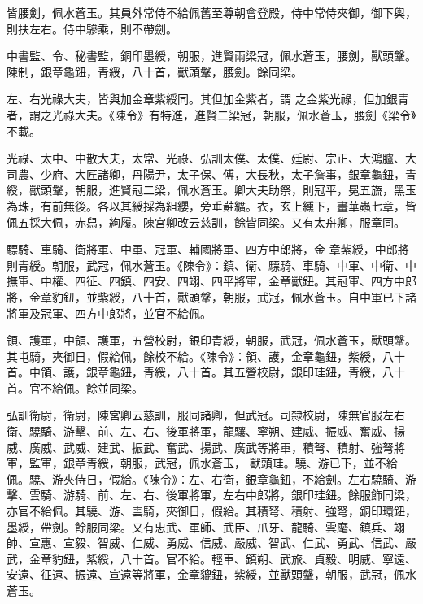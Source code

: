 \begin{pinyinscope}
 皆腰劍，佩水蒼玉。其員外常侍不給佩舊至尊朝會登殿，侍中常侍夾御，御下輿，則扶左右。侍中驂乘，則不帶劍。



 中書監、令、秘書監，銅印墨綬，朝服，進賢兩梁冠，佩水蒼玉，腰劍，獸頭鞶。陳制，銀章龜鈕，青綬，八十首，獸頭鞶，腰劍。餘同梁。



 左、右光祿大夫，皆與加金章紫綬同。其但加金紫者，謂
 之金紫光祿，但加銀青者，謂之光祿大夫。《陳令》有特進，進賢二梁冠，朝服，佩水蒼玉，腰劍《梁令》不載。



 光祿、太中、中散大夫，太常、光祿、弘訓太僕、太僕、廷尉、宗正、大鴻臚、大司農、少府、大匠諸卿，丹陽尹，太子保、傅，大長秋，太子詹事，銀章龜鈕，青綬，獸頭鞶，朝服，進賢冠二梁，佩水蒼玉。卿大夫助祭，則冠平，冕五旒，黑玉為珠，有前無後。各以其綬採為組纓，旁垂黈纊。衣，玄上纁下，畫華蟲七章，皆佩五採大佩，赤舄，絇履。陳宮卿改云慈訓，餘皆同梁。又有太舟卿，服章同。



 驃騎、車騎、衛將軍、中軍、冠軍、輔國將軍、四方中郎將，金
 章紫綬，中郎將則青綬。朝服，武冠，佩水蒼玉。《陳令》：鎮、衛、驃騎、車騎、中軍、中衛、中撫軍、中權、四征、四鎮、四安、四翊、四平將軍，金章獸鈕。其冠軍、四方中郎將，金章豹鈕，並紫綬，八十首，獸頭鞶，朝服，武冠，佩水蒼玉。自中軍已下諸將軍及冠軍、四方中郎將，並官不給佩。



 領、護軍，中領、護軍，五營校尉，銀印青綬，朝服，武冠，佩水蒼玉，獸頭鞶。其屯騎，夾御日，假給佩，餘校不給。《陳令》：領、護，金章龜鈕，紫綬，八十首。中領、護，銀章龜鈕，青綬，八十首。其五營校尉，銀印珪鈕，青綬，八十首。官不給佩。餘並同梁。



 弘訓衛尉，衛尉，陳宮卿云慈訓，服同諸卿，但武冠。司隸校尉，陳無官服左右衛、驍騎、游擊、前、左、右、後軍將軍，龍驤、寧朔、建威、振威、奮威、揚威、廣威、武威、建武、振武、奮武、揚武、廣武等將軍，積弩、積射、強弩將軍，監軍，銀章青綬，朝服，武冠，佩水蒼玉，
 獸頭珪。驍、游已下，並不給佩。驍、游夾侍日，假給。《陳令》：左、右衛，銀章龜鈕，不給劍。左右驍騎、游擊、雲騎、游騎、前、左、右、後軍將軍，左右中郎將，銀印珪鈕。餘服飾同梁，亦官不給佩。其驍、游、雲騎，夾御日，假給。其積弩、積射、強弩，銅印環鈕，墨綬，帶劍。餘服同梁。又有忠武、軍師、武臣、爪牙、龍騎、雲麾、鎮兵、翊帥、宣惠、宣毅、智威、仁威、勇威、信威、嚴威、智武、仁武、勇武、信武、嚴武，金章豹鈕，紫綬，八十首。官不給。輕車、鎮朔、武旅、貞毅、明威、寧遠、安遠、征遠、振遠、宣遠等將軍，金章貔鈕，紫綬，並獸頭鞶，朝服，武冠，佩水蒼玉。




\end{pinyinscope}
